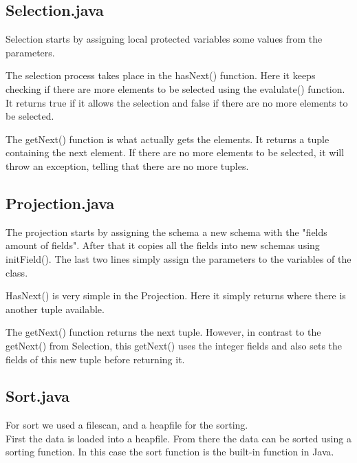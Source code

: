 \documentclass[a4paper,10pt,titlepage]{report}
\begin{document}
\subsection{Selection.java}
Selection starts by assigning local protected variables some values from the parameters. 

The selection process takes place in the hasNext() function. Here it keeps checking if there are more elements to be selected using the evalulate() function. It returns true if it allows the selection and false if there are no more elements to be selected.

The getNext() function is what actually gets the elements. It returns a tuple containing the next element. If there are no more elements to be selected, it will throw an exception, telling that there are no more tuples.

\vspace{10mm}
\subsection{Projection.java}
The projection starts by assigning the schema a new schema with the "fields amount of fields". After that it copies all the fields into new schemas using initField(). The last two lines simply assign the parameters to the variables of the class.

HasNext() is very simple in the Projection. Here it simply returns where there is another tuple available.

The getNext() function returns the next tuple. However, in contrast to the getNext() from Selection, this getNext() uses the integer fields and also sets the fields of this new tuple before returning it.



\subsection{Sort.java}
For sort we used a filescan, and a heapfile for the sorting. \\
First the data is loaded into a heapfile. From there the data can be sorted using a sorting function. In this case the sort function is the built-in function in Java.

\end{document}
